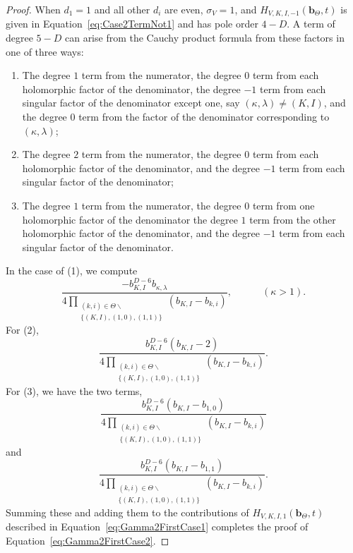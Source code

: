 \documentclass{amsart}
\theoremstyle{definition}
\theoremstyle{remark}
\newcommand{\bs}{\boldsymbol}
\begin{document}
\begin{proof}
When $d_1 = 1$ and all other $d_i$ are even, $\sigma_V = 1$, and $H_{V,K,I,-1}(\bs{b}_\Theta, t)$ is given in
Equation~\eqref{eq:Case2TermNot1}
and has pole order $4-D$. A term of degree $5-D$ can arise from the Cauchy product formula from these factors in one
of three ways:
\begin{enumerate}
\item   The degree $1$ term from the numerator,
        the degree $0$ term from each holomorphic factor of the denominator,
        the degree $-1$ term from each singular factor of the
        denominator except one, say $(\kappa,\lambda) \neq (K,I)$, and the degree $0$ term from
        the factor of the denominator corresponding to $(\kappa,\lambda)$;
\item   The degree $2$ term from the numerator, the degree $0$ term from each holomorphic factor of the denominator,
        and the degree $-1$ term from each singular factor of the denominator;
\item   The degree $1$ term from the numerator, the degree $0$ term from one holomorphic factor of the denominator
        the degree $1$ term from the other holomorphic factor of the denominator, and the degree $-1$ term from each
        singular factor of the denominator.
\end{enumerate}
In the case of (1), we compute
\[
    \frac{- b_{K,I}^{D-6} b_{\kappa,\lambda}}
        {4\prod\limits_{\substack{(k,i)\in\Theta\smallsetminus \\ \{ (K,I), (1,0), (1,1) \} }} (b_{K,I} - b_{k,i})},
    \quad\quad\quad (\kappa > 1).
\]
For (2),
\[
    \frac{b_{K,I}^{D-6}(b_{K,I} - 2)}
        {4\prod\limits_{\substack{(k,i)\in\Theta\smallsetminus \\ \{ (K,I), (1,0), (1,1) \} }} (b_{K,I} - b_{k,i})}.
\]
For (3), we have the two terms,
\[
    \frac{b_{K,I}^{D-6}(b_{K,I} - b_{1,0})}
        {4\prod\limits_{\substack{(k,i)\in\Theta\smallsetminus \\ \{ (K,I), (1,0), (1,1) \} }} (b_{K,I} - b_{k,i})}
\]
and
\[
    \frac{b_{K,I}^{D-6}(b_{K,I} - b_{1,1})}
        {4\prod\limits_{\substack{(k,i)\in\Theta\smallsetminus \\ \{ (K,I), (1,0), (1,1) \} }} (b_{K,I} - b_{k,i})}.
\]
Summing these and adding them to the contributions of $H_{V,K,I,1}(\bs{b}_\Theta,t)$ described in
Equation~\eqref{eq:Gamma2FirstCase1} completes the proof of Equation~\eqref{eq:Gamma2FirstCase2}.
\end{proof}
\end{document}
